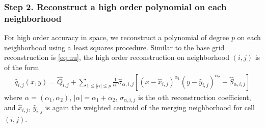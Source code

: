 \subsubsection*{Step 2. Reconstruct a high order polynomial on each neighborhood}
For high order accuracy in space, we reconstruct a polynomial of degree $p$ on each neighborhood using a least squares procedure.  Similar to the base grid reconstruction is \eqref{eq:uu}, the high order reconstruction on neighborhood $(i,j)$ is of the form
\begin{equation}\label{eq:q}
\begin{aligned}
    \widehat q_{i,j} (x,y) = \widehat{Q}_{i,j} +  \sum_{1 \leq
    |\alpha| \leq p}  \frac{1}{\alpha!} \widehat \sigma_{\alpha,i,j}
    [(x-\widehat x_{i,j})^{\alpha_1}(y-\widehat
    y_{i,j})^{\alpha_2}-\widehat S_{\alpha,i,j}]
\end{aligned}
\end{equation}
where $\alpha = (\alpha_1, \alpha_2)$, $|\alpha| = \alpha_1 + \alpha_2$, $\sigma_{\alpha,i,j}$ is the $\alpha$th reconstruction coefficient,
and $\widehat x_{i,j}$, $\widehat y_{i,j}$ is again the weighted centroid of the merging neighborhood for cell $(i,j)$. 
